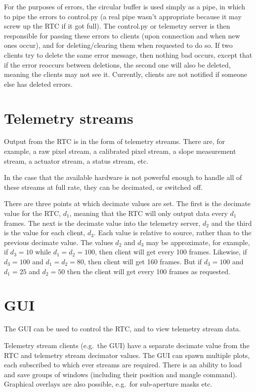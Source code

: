 \documentclass[a4,10pt]{article}
\begin{document}
For the purposes of errors, the circular buffer is used simply as a
pipe, in which to pipe the errors to control.py (a real pipe wasn't
appropriate because it may screw up the RTC if it got full).  The
control.py or telemetry server is then responsible for passing these
errors to clients (upon connection and when new ones occur), and for
deleting/clearing them when requested to do so.  If two clients try to
delete the same error message, then nothing bad occurs, except that if
the error reoccurs between deletions, the second one will also be
deleted, meaning the clients may not see it.  Currently, clients are
not notified if someone else has deleted errors.


\section{Telemetry streams}
Output from the RTC is in the form of telemetry streams.  There are,
for example, a raw pixel stream, a calibrated pixel stream, a slope
measurement stream, a actuator stream, a status stream, etc.

In the case that the available hardware is not powerful enough to
handle all of these streams at full rate, they can be decimated, or
switched off.

There are three points at which decimate values are set.  The first is
the decimate value for the RTC, $d_1$, meaning that the RTC will only
output data every $d_1$ frames.  The next is the decimate value into
the telemetry server, $d_2$ and the third is the value for each
client, $d_3$.  Each value is relative to source, rather than to the
previous decimate value.  The values $d_2$ and $d_3$ may be approximate, for
example, if $d_3=10$ while $d_1=d_2=100$, then client will get every
100 frames.
Likewise, if $d_3=100$ and $d_1=d_2=80$, then client will get
160 frames.  But if $d_3=100$ and $d_1=25$ and $d_2=50$ then the
client will get every 100 frames as requested.

\section{GUI}
The GUI can be used to control the RTC, and to view telemetry stream data.

Telemetry stream clients (e.g.\ the GUI) have a separate decimate
value from the RTC and telemetry stream decimator values.  The GUI can
spawn multiple plots, each subscribed to which ever streams are
required.  There is an ability to load and save groups of windows
(including their position and mangle command).  Graphical overlays are
also possible, e.g.\ for sub-aperture masks etc.
\end{document}
